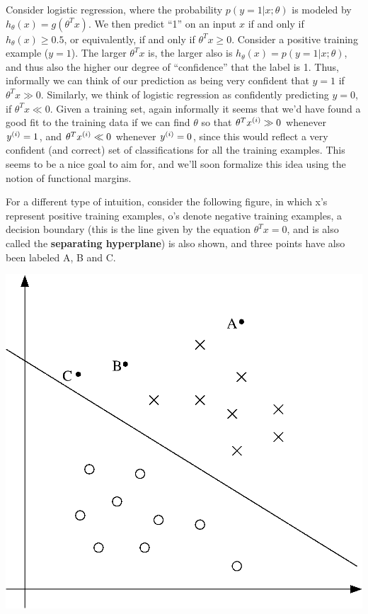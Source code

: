\documentclass{article}
\begin{document}
Consider logistic regression,
where the probability $p(y=1|x;\theta)$ is modeled by $h_\theta(x) = g(\theta^Tx)$.
We then predict ``1'' on an input $x$ if and only if $h_\theta (x) \geq 0.5$, or equivalently,
if and only if $\theta^Tx \geq 0$.  Consider a positive training example ($y=1$).  The larger
$\theta^Tx$ is, the larger also is $h_\theta(x) = p(y=1|x;\theta)$, and thus also the higher our
degree of ``confidence'' that the label is 1.  Thus, informally we can think of our
prediction as being very confident that $y=1$ if $\theta^Tx \gg 0$.  Similarly, we
think of logistic regression as confidently predicting $y=0$, if $\theta^Tx \ll 0$.
Given a training set, again informally it seems that we'd have found a good fit to the
training data if we can find $\theta$
so that $\theta^T{x^{(i)}} \gg 0$ whenever ${y^{(i)}}=1$, and
$\theta^T{x^{(i)}} \ll 0$ whenever ${y^{(i)}}=0$, since this would reflect a very confident (and correct)
set of classifications for all the training examples.  This seems to be a nice goal to
aim for, and we'll soon formalize this idea using the notion of functional margins.

For a different type of intuition, consider the following figure, in which x's represent
positive training examples, o's denote negative training examples,
a decision boundary
(this is the line given by the equation $\theta^Tx=0$, and is also called
the {\bf separating hyperplane}) is also shown, and three points have also been labeled
A, B and C.

\begin{center}
\includegraphics[scale=0.5]{geometricMargin1.eps}
\end{center}
\end{document}
